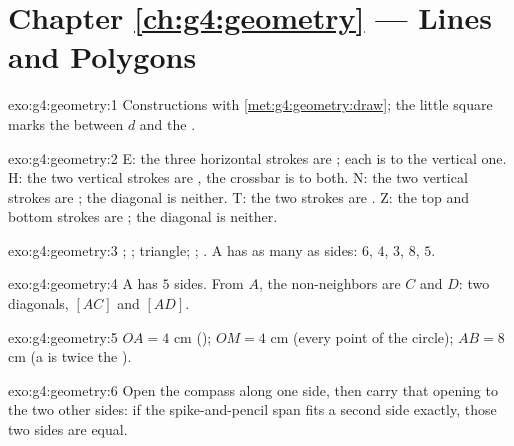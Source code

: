 \section*{Chapter \ref{ch:g4:geometry} --- Lines and Polygons}

\begin{solution}{exo:g4:geometry:1}
Constructions with \cref{met:g4:geometry:draw}; the little square
marks the  between $d$ and the .
\end{solution}

\begin{solution}{exo:g4:geometry:2}
E: the three horizontal strokes are ; each is 
to the vertical one. H: the two vertical strokes are , the
crossbar is  to both. N: the two vertical strokes are
; the diagonal is neither. T: the two strokes are
. Z: the top and bottom strokes are ; the
diagonal is neither.
\end{solution}

\begin{solution}{exo:g4:geometry:3}
; ; triangle; ; . A  has
as many  as sides: $6$, $4$, $3$, $8$, $5$.
\end{solution}

\begin{solution}{exo:g4:geometry:4}
A  has $5$ sides. From $A$, the non-neighbors are $C$ and
$D$: two diagonals, $[AC]$ and $[AD]$.
\end{solution}

\begin{solution}{exo:g4:geometry:5}
$OA = 4$ cm (); $OM = 4$ cm (every point of the circle);
$AB = 8$ cm (a  is twice the ).
\end{solution}

\begin{solution}{exo:g4:geometry:6}
Open the compass along one side, then carry that opening to the two
other sides: if the spike-and-pencil span fits a second side
exactly, those two sides are equal.
\end{solution}

